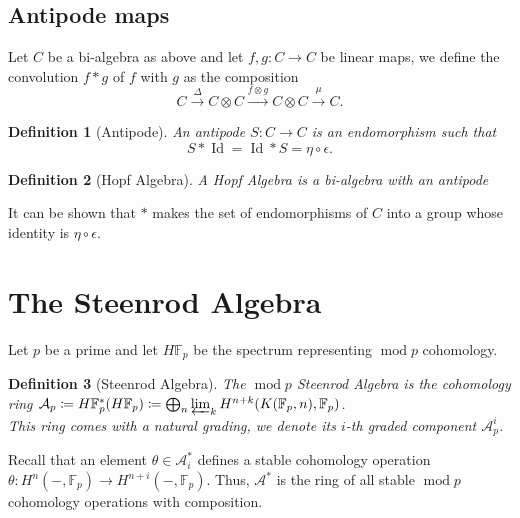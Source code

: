 \documentclass[11pt, a4paper]{article}
\DeclareMathOperator*{\id}{Id}
\DeclareMathOperator*{\cmod}{mod}
\newtheorem{defn}{Definition}
\theoremstyle{plain}
\begin{document}
\subsection{Antipode maps}
Let $C$ be a bi-algebra as above and let $f,g\colon C\to C$ be linear maps, we define the convolution $f\ast g$ of $f$ with $g$ as the composition
\[ 
	C \xrightarrow{\Delta} C\otimes C \xrightarrow{f\otimes g} C\otimes C \xrightarrow{\mu} C.
\]
\begin{defn}[Antipode]
	An antipode $S\colon C\to C$ is an endomorphism such that
	\[ 
	S\ast \id = \id\ast S = \eta\circ \epsilon.
	\]
\end{defn}
\begin{defn}[Hopf Algebra]
A Hopf Algebra is a bi-algebra with an antipode
\end{defn}
It can be shown that $\ast$ makes the set of endomorphisms of $C$ into a group whose identity is $\eta\circ \epsilon$.
\section{The Steenrod Algebra}

Let $p$ be a prime and let $H\mathbb{F}_p$ be the spectrum representing $\cmod p$ cohomology.
\begin{defn}[Steenrod Algebra]
	The $\cmod p$ Steenrod Algebra is the cohomology ring $\mathcal{A}_p \coloneq H\mathbb{F}_p^{\ast}( H\mathbb{F}_p) \coloneq \bigoplus_n \varprojlim_k H^{n+k}( K( \mathbb{F}_p,n), \mathbb{F}_p )$.\\
	This ring comes with a natural grading, we denote its $i$-th graded component $\mathcal{A}_p^{i}$.
\end{defn}
Recall that an element $\theta \in \mathcal{A}_i^\ast$ defines a stable cohomology operation $\theta\colon H^{n}( -, \mathbb{F}_p) \to H^{n+i}( -, \mathbb{F}_p) $. Thus, $\mathcal{A}^{\ast}$ is the ring of all stable $\cmod p$ cohomology operations with composition.
\end{document}
